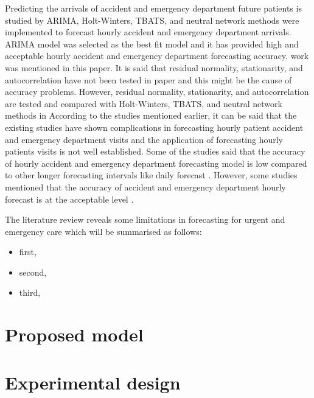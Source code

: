 \documentclass[]{elsarticle} %
\providecommand{\tightlist}{%
  \setlength{\itemsep}{0pt}\setlength{\parskip}{0pt}}
\begin{document}
Predicting the arrivals of accident and emergency department future patients is studied by \citet{choudhury2020forecasting} ARIMA, Holt-Winters, TBATS, and neutral network methods were implemented to forecast hourly accident and emergency department arrivals. ARIMA model was selected as the best fit model and it has provided high and acceptable hourly accident and emergency department forecasting accuracy. \citet{hertzum2017forecasting} work was mentioned in this paper. It is said that residual normality, stationarity, and autocorrelation have not been tested in \citet{hertzum2017forecasting} paper and this might be the cause of accuracy problems. However, residual normality, stationarity, and autocorrelation are tested and compared with Holt-Winters, TBATS, and neutral network methods in \citet{choudhury2020forecasting}
According to the studies mentioned earlier, it can be said that the existing studies have shown complications in forecasting hourly patient accident and emergency department visits and the application of forecasting hourly patients visits is not well established. Some of the studies said that the accuracy of hourly accident and emergency department forecasting model is low compared to other longer forecasting intervals like daily forecast \citep{boyle2012predicting, hertzum2017forecasting}. However, some studies mentioned that the accuracy of accident and emergency department hourly forecast is at the acceptable level \citep{choudhury2020forecasting, mccarthy2008challenge, schweigler2009forecasting}.

The literature review reveals some limitations in forecasting for urgent and emergency care which will be summarised as follows:

\begin{itemize}
\tightlist
\item
  first,
\item
  second,
\item
  third,
\end{itemize}

\hypertarget{model}{%
\section{Proposed model}\label{model}}

\hypertarget{design}{%
\section{Experimental design}\label{design}}
\end{document}
